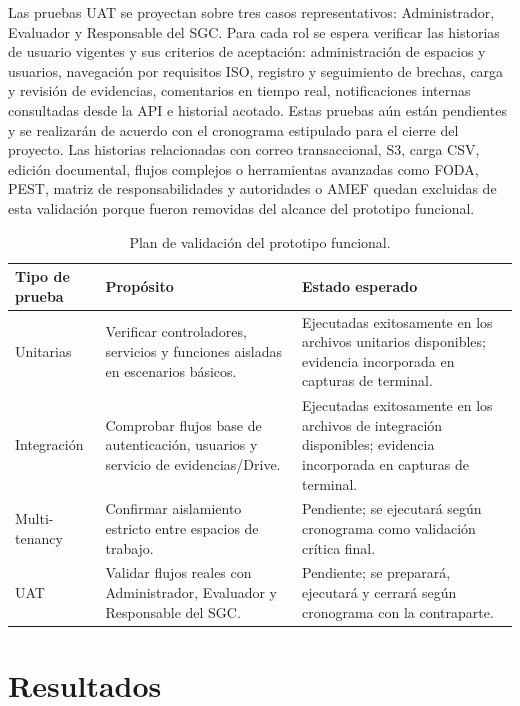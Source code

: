 \documentclass[final]{udpthesis}
\begin{document}
Las pruebas UAT se proyectan sobre tres casos representativos: Administrador, Evaluador y Responsable del SGC. Para cada rol se espera verificar las historias de usuario vigentes y sus criterios de aceptación: administración de espacios y usuarios, navegación por requisitos ISO, registro y seguimiento de brechas, carga y revisión de evidencias, comentarios en tiempo real, notificaciones internas consultadas desde la API e historial acotado. Estas pruebas aún están pendientes y se realizarán de acuerdo con el cronograma estipulado para el cierre del proyecto. Las historias relacionadas con correo transaccional, S3, carga CSV, edición documental, flujos complejos o herramientas avanzadas como FODA, PEST, matriz de responsabilidades y autoridades o AMEF quedan excluidas de esta validación porque fueron removidas del alcance del prototipo funcional.

\begin{table}[H]
\centering
\small
\begin{tabularx}{\textwidth}{|L{2.8cm}|Y|Y|}
\hline
{}\textbf{Tipo de prueba} & \textbf{Propósito} & \textbf{Estado esperado} \\ \hline
Unitarias & Verificar controladores, servicios y funciones aisladas en escenarios básicos. & Ejecutadas exitosamente en los archivos unitarios disponibles; evidencia incorporada en capturas de terminal. \\ \hline
Integración & Comprobar flujos base de autenticación, usuarios y servicio de evidencias/Drive. & Ejecutadas exitosamente en los archivos de integración disponibles; evidencia incorporada en capturas de terminal. \\ \hline
Multi-tenancy & Confirmar aislamiento estricto entre espacios de trabajo. & Pendiente; se ejecutará según cronograma como validación crítica final. \\ \hline
UAT & Validar flujos reales con Administrador, Evaluador y Responsable del SGC. & Pendiente; se preparará, ejecutará y cerrará según cronograma con la contraparte. \\ \hline
\end{tabularx}
\normalsize
\caption{Plan de validación del prototipo funcional.}
\label{tab:validacion}
\end{table}


\chapter{Resultados}
\end{document}
